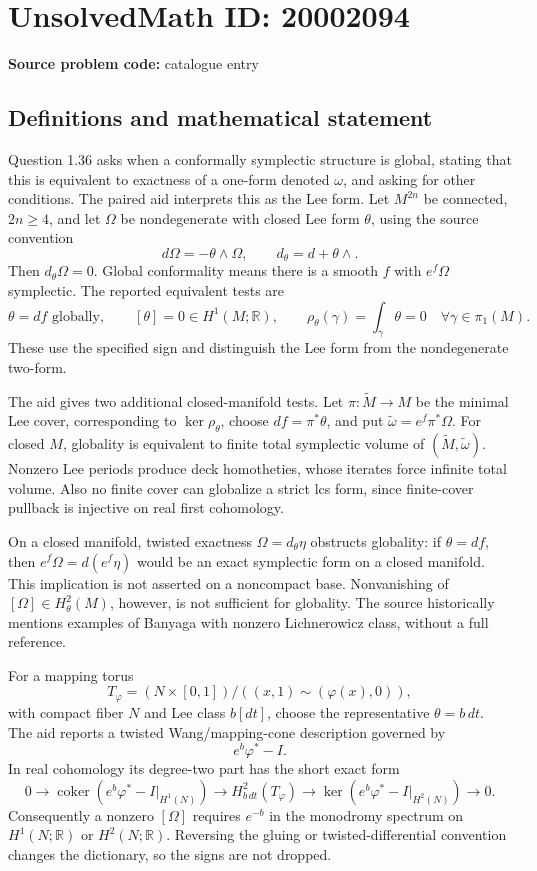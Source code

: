 \documentclass[11pt]{article}
\begin{document}
\section*{UnsolvedMath ID: 20002094}
\textbf{Source problem code:} catalogue entry
\subsection{Definitions and mathematical statement}
Question 1.36 asks when a conformally symplectic structure is global, stating that this is equivalent to exactness of a one-form denoted \(\omega\), and asking for other conditions. The paired aid interprets this as the Lee form. Let \(M^{2n}\) be connected, \(2n\geq4\), and let \(\Omega\) be nondegenerate with closed Lee form \(\theta\), using the source convention
\[
 d\Omega=-\theta\wedge\Omega,\qquad
 d_\theta=d+\theta\wedge.
\]
Then \(d_\theta\Omega=0\). Global conformality means there is a smooth \(f\) with \(e^f\Omega\) symplectic. The reported equivalent tests are
\[
 \theta=df\text{ globally},\qquad [\theta]=0\in H^1(M;\mathbb R),\qquad
 \rho_\theta(\gamma)=\int_\gamma\theta=0\quad\forall\gamma\in\pi_1(M).
\]
These use the specified sign and distinguish the Lee form from the nondegenerate two-form.

The aid gives two additional closed-manifold tests. Let \(\pi:\widetilde M\to M\) be the minimal Lee cover, corresponding to \(\ker\rho_\theta\), choose \(df=\pi^*\theta\), and put \(\widetilde\omega=e^f\pi^*\Omega\). For closed \(M\), globality is equivalent to finite total symplectic volume of \((\widetilde M,\widetilde\omega)\). Nonzero Lee periods produce deck homotheties, whose iterates force infinite total volume. Also no finite cover can globalize a strict lcs form, since finite-cover pullback is injective on real first cohomology.

On a closed manifold, twisted exactness \(\Omega=d_\theta\eta\) obstructs globality: if \(\theta=df\), then \(e^f\Omega=d(e^f\eta)\) would be an exact symplectic form on a closed manifold. This implication is not asserted on a noncompact base. Nonvanishing of \([\Omega]\in H^2_\theta(M)\), however, is not sufficient for globality. The source historically mentions examples of Banyaga with nonzero Lichnerowicz class, without a full reference.

For a mapping torus
\[
 T_\varphi=(N\times[0,1])/((x,1)\sim(\varphi(x),0)),
\]
with compact fiber \(N\) and Lee class \(b[dt]\), choose the representative \(\theta=b\,dt\). The aid reports a twisted Wang/mapping-cone description governed by
\[
 e^b\varphi^*-I.
\]
In real cohomology its degree-two part has the short exact form
\[
 0\longrightarrow\operatorname{coker}(e^b\varphi^*-I|_{H^1(N)})
 \longrightarrow H^2_{b\,dt}(T_\varphi)
 \longrightarrow\ker(e^b\varphi^*-I|_{H^2(N)})
 \longrightarrow0.
\]
Consequently a nonzero \([\Omega]\) requires \(e^{-b}\) in the monodromy spectrum on \(H^1(N;\mathbb R)\) or \(H^2(N;\mathbb R)\). Reversing the gluing or twisted-differential convention changes the dictionary, so the signs are not dropped.
\end{document}
